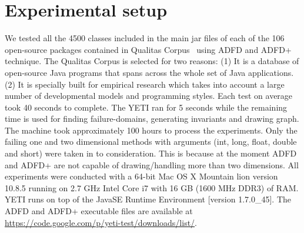\documentclass[conference]{IEEEtran}
\begin{document}





\section{Experimental setup}
We tested all the 4500 classes included in the main jar files of each of the 106 open-source packages contained in Qualitas Corpus~\cite{Tempero2010} using ADFD and ADFD+ technique. The Qualitas Corpus is selected for two reasons: (1) It is a database of open-source Java programs that spans across the whole set of Java applications. (2) It is specially built for empirical research which takes into account a large number of developmental models and programming styles. Each test on average took 40 seconds to complete. The YETI ran for 5 seconds while the remaining time is used for finding failure-domains, generating invariants and drawing graph. The machine took approximately 100 hours to process the experiments. Only the failing one and two dimensional methods with arguments (int, long, float, double and short) were taken in to consideration. This is because at the moment ADFD and ADFD+ are not capable of drawing/handling more than two dimensions. All experiments were conducted with a 64-bit Mac OS X Mountain lion version 10.8.5 running on 2.7 GHz Intel Core i7 with 16 GB (1600 MHz DDR3) of RAM. YETI runs on top of the Java\texttrademark  SE Runtime Environment [version 1.7.0\_45]. The ADFD and ADFD+ executable files are available at \url{https://code.google.com/p/yeti-test/downloads/list/}. 
\end{document}
